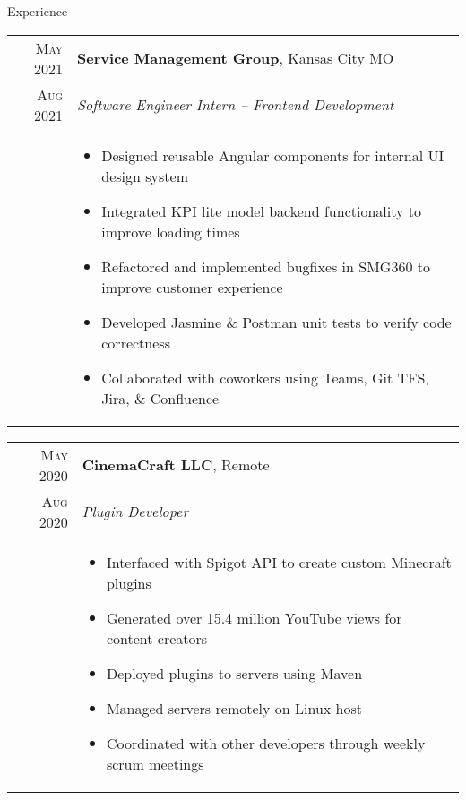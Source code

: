 \documentclass{resume}
\begin{document}
\begin{rSection}{Experience}
\small
{
  \begin{tabular}{r|p{15cm}}
    \textsc{May 2021} & \textbf{Service Management Group}, Kansas City MO \\
    \textsc{Aug 2021}  & \textit{Software Engineer Intern – Frontend Development} \\ &
    \begin{itemize}
      \item {Designed reusable Angular components for internal UI design system }
      \item {Integrated KPI lite model backend functionality to improve loading times}
      \item {Refactored and implemented bugfixes in SMG360 to improve customer experience}
      \item {Developed Jasmine \& Postman unit tests to verify code correctness}
      \item {Collaborated with coworkers using Teams, Git TFS, Jira, \& Confluence}
    \end{itemize}
  \end{tabular}
  
  \begin{tabular}{r|p{15cm}}
    \textsc{May 2020} & \textbf{CinemaCraft LLC}, Remote \\
    \textsc{Aug 2020}  & \textit{Plugin Developer} \\ &
    \begin{itemize}
      \item {Interfaced with Spigot API to create custom Minecraft plugins}
      \item {Generated over 15.4 million YouTube views for content creators}
      \item {Deployed plugins to servers using Maven}
      \item {Managed servers remotely on Linux host}
      \item {Coordinated with other developers through weekly scrum meetings}
    \end{itemize}
  \end{tabular}

}
\end{rSection}
\end{document}
